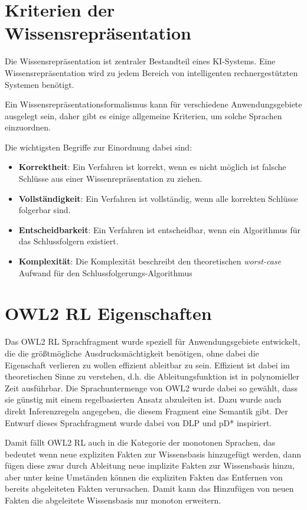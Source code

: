 \section{Kriterien der Wissensrepräsentation}

Die Wissensrepräsentation ist zentraler Bestandteil eines KI-Systems. Eine Wissensrepräsentation wird zu jedem Bereich von intelligenten rechnergestützten Systemen benötigt.

Ein Wissensrepräsentationsformalismus kann für verschiedene Anwendungsgebiete ausgelegt sein, daher gibt es einige allgemeine Kriterien, um solche Sprachen einzuordnen.

Die wichtigsten Begriffe zur Einordnung dabei sind:
\begin{itemize}
	\item \textbf{Korrektheit}:
Ein Verfahren ist korrekt, wenn es nicht möglich ist falsche Schlüsse aus einer Wissenrepräsentation zu ziehen.
	\item \textbf{Vollständigkeit}:
Ein Verfahren ist vollständig, wenn alle korrekten Schlüsse folgerbar sind.
	\item \textbf{Entscheidbarkeit}:
Ein Verfahren ist entscheidbar, wenn ein Algorithmus für das Schlussfolgern existiert.
	\item \textbf{Komplexität}:
Die Komplexität beschreibt den theoretischen \emph{worst-case} Aufwand für den Schlussfolgerungs-Algorithmus
\end{itemize}

\section{OWL2 RL Eigenschaften}
Das OWL2 RL Sprachfragment wurde speziell für Anwendungsgebiete entwickelt, die die größtmögliche Ausdrucksmächtigkeit benötigen, ohne dabei die Eigenschaft verlieren zu wollen effizient ableitbar zu sein. Effizient ist dabei im theoretischen Sinne zu verstehen, d.h. die Ableitungsfunktion ist in polynomieller Zeit ausführbar. Die Sprachuntermenge von OWL2 wurde dabei so gewählt, dass sie günstig mit einem regelbasierten Ansatz abzuleiten ist. Dazu wurde auch direkt Inferenzregeln angegeben, die diesem Fragment eine Semantik gibt. Der Entwurf dieses Sprachfragment wurde dabei von DLP \cite{Grosof2003} und pD* \cite{Li2006} inspiriert.

Damit fällt OWL2 RL auch in die Kategorie der monotonen Sprachen, das bedeutet wenn neue expliziten Fakten zur Wissensbasis hinzugefügt werden, dann fügen diese zwar durch Ableitung neue implizite Fakten zur Wissensbasis hinzu, aber unter keine Umständen können die expliziten Fakten das Entfernen von bereits abgeleiteten Fakten verursachen. Damit kann das Hinzufügen von neuen Fakten die abgeleitete Wissensbasis nur monoton erweitern.

